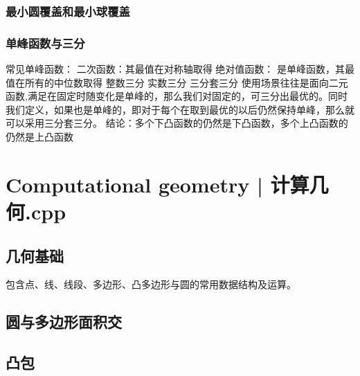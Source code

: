 \documentclass[8pt,a4paper]{article}
\newcommand{\code}[1]{
    
}
\newcommand{\txt}[1]{\par\noindent\footnotesize #1}
\newcommand{\inlineformula}[1]{\ensuremath{}}
\begin{document}
\begin{multicols}{2}
        \subsubsection{最小圆覆盖和最小球覆盖}
            \code{src/number_theory/随机化算法_18_5.cpp}
        \subsubsection{单峰函数与三分}
            \txt{常见单峰函数：
二次函数：其最值在对称轴取得
绝对值函数：
\inlineformula{./assets/formulas_tex/formula_672.tex}是单峰函数，其最值在所有\inlineformula{./assets/formulas_tex/formula_673.tex}的中位数取得
整数三分
实数三分
三分套三分
使用场景往往是面向二元函数\inlineformula{./assets/formulas_tex/formula_674.tex},满足在固定\inlineformula{./assets/formulas_tex/formula_675.tex}时\inlineformula{./assets/formulas_tex/formula_676.tex}随\inlineformula{./assets/formulas_tex/formula_677.tex}变化是单峰的，那么我们对固定的\inlineformula{./assets/formulas_tex/formula_678.tex}，可三分出最优的\inlineformula{./assets/formulas_tex/formula_679.tex}。同时我们定义\inlineformula{./assets/formulas_tex/formula_680.tex}，如果\inlineformula{./assets/formulas_tex/formula_681.tex}也是单峰的，即对于每个\inlineformula{./assets/formulas_tex/formula_682.tex}在取到最优的\inlineformula{./assets/formulas_tex/formula_683.tex}以后仍然保持单峰，那么就可以采用三分套三分。
结论：多个下凸函数的\inlineformula{./assets/formulas_tex/formula_684.tex}仍然是下凸函数，多个上凸函数的\inlineformula{./assets/formulas_tex/formula_685.tex}仍然是上凸函数}
            \code{src/number_theory/随机化算法_20_5.cpp}

\section{Computational geometry | 计算几何.cpp}
    \subsection{几何基础}
        \txt{包含点、线、线段、多边形、凸多边形与圆的常用数据结构及运算。}
        \code{src/computational_geometry/geometry_base.cpp}
    \subsection{圆与多边形面积交}
        \code{src/computational_geometry/circle_polygon_area.cpp}
    \subsection{凸包}
        \code{src/computational_geometry/convex_hull.cpp}

\end{multicols}
\end{document}
